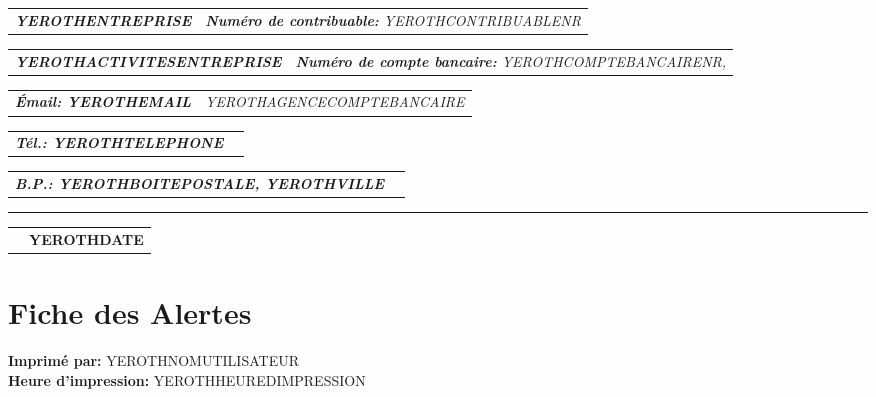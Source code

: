 \documentclass[16pt,YEROTHPAPERSPEC]{article} %
\makeatletter
\newcommand{\headerrow}[2]
{\begin{tabular*}{\linewidth}{l@{\extracolsep{\fill}}r}
	#1 &
	#2 \\
\end{tabular*}}
\newcommand{\emphbold}[1]{\textbf{\emph{#1}}\xspace}
\makeatother
\begin{document}
\bigskip

\headerrow
	{\emphbold{YEROTHENTREPRISE}}
	{\emph{\textbf{Num\'ero de contribuable:} YEROTHCONTRIBUABLENR}}
\headerrow
	{\emphbold{YEROTHACTIVITESENTREPRISE}}
	{\emph{\textbf{Num\'ero de compte bancaire:} YEROTHCOMPTEBANCAIRENR,}}
\headerrow
	{\emphbold{\'Email: YEROTHEMAIL}}
	{\emph{YEROTHAGENCECOMPTEBANCAIRE}}
\headerrow
	{\emphbold{T\'el.: YEROTHTELEPHONE}}
	{}
\headerrow
	{\emphbold{B.P.: YEROTHBOITEPOSTALE, YEROTHVILLE}}
	{}
	
\hrule

\headerrow
	{}
	{\textbf{YEROTHDATE}}

\section*{Fiche des Alertes}

\textbf{Imprim\'e par:} YEROTHNOMUTILISATEUR\\
\textbf{Heure d'impression:} YEROTHHEUREDIMPRESSION

\vspace{0.3cm}
\end{document}
